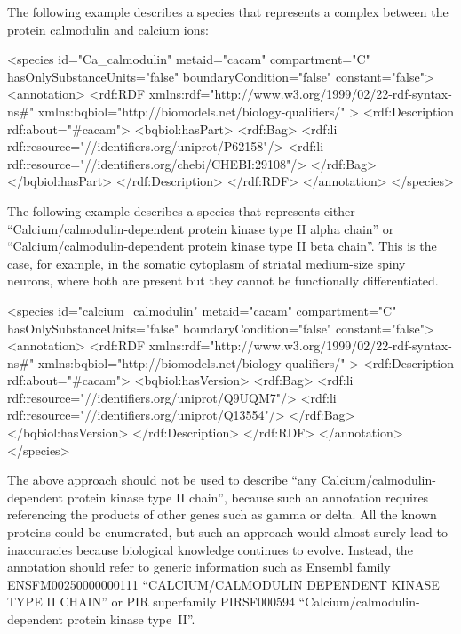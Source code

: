 The following example describes a species that represents a
complex between the protein calmodulin and calcium ions:

\begin{example}
<species id="Ca_calmodulin" metaid="cacam" compartment="C"
         hasOnlySubstanceUnits="false" boundaryCondition="false"
         constant="false">
  <annotation>
    <rdf:RDF
      xmlns:rdf="http://www.w3.org/1999/02/22-rdf-syntax-ns\#"
      xmlns:bqbiol="http://biomodels.net/biology-qualifiers/"
    >
      <rdf:Description rdf:about="\#cacam">
        <bqbiol:hasPart>
          <rdf:Bag>
            <rdf:li rdf:resource="//identifiers.org/uniprot/P62158\!"/>
            <rdf:li rdf:resource="//identifiers.org/chebi/CHEBI:29108\!"/>
          </rdf:Bag>
        </bqbiol:hasPart>
      </rdf:Description>
    </rdf:RDF>
  </annotation>
</species>
\end{example}

The following example describes a species that represents either
``Calcium/calmodulin-dependent protein kinase type II alpha
chain'' or ``Calcium/calmodulin-dependent protein kinase type II
beta chain''. This is the case, for example, in the somatic
cytoplasm of striatal medium-size spiny neurons, where both are
present but they cannot be functionally differentiated.


\begin{example}
<species id="calcium_calmodulin" metaid="cacam" compartment="C"
         hasOnlySubstanceUnits="false" boundaryCondition="false"
         constant="false">
  <annotation>
    <rdf:RDF
      xmlns:rdf="http://www.w3.org/1999/02/22-rdf-syntax-ns\#"
      xmlns:bqbiol="http://biomodels.net/biology-qualifiers/"
    >
      <rdf:Description rdf:about="\#cacam">
        <bqbiol:hasVersion>
          <rdf:Bag>
            <rdf:li rdf:resource="//identifiers.org/uniprot/Q9UQM7\!"/>
            <rdf:li rdf:resource="//identifiers.org/uniprot/Q13554\!"/>
          </rdf:Bag>
        </bqbiol:hasVersion>
      </rdf:Description>
    </rdf:RDF>
  </annotation>
</species>
\end{example}


The above approach should not be used to describe ``any
Calcium/calmodulin-dependent protein kinase type II chain'',
because such an annotation requires referencing the products of
other genes such as gamma or delta. All the known proteins could
be enumerated, but such an approach would almost surely lead to
inaccuracies because biological knowledge continues to evolve.
Instead, the annotation should refer to generic information such
as Ensembl family ENSFM00250000000111 ``CALCIUM/CALMODULIN DEPENDENT
KINASE TYPE II CHAIN'' or PIR superfamily PIRSF000594
``Calcium/calmodulin-dependent protein kinase type~II''.

